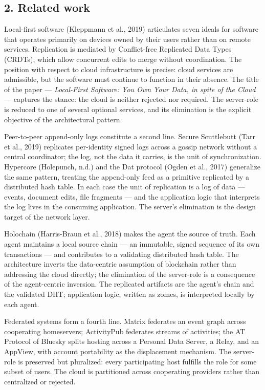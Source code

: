 \documentclass[
]{article}
\begin{document}
\subsection{2. Related work}\label{related-work}

Local-first software (Kleppmann et al., 2019) articulates seven ideals
for software that operates primarily on devices owned by their users
rather than on remote services. Replication is mediated by Conflict-free
Replicated Data Types (CRDTs), which allow concurrent edits to merge
without coordination. The position with respect to cloud infrastructure
is precise: cloud services are admissible, but the software must
continue to function in their absence. The title of the paper ---
\emph{Local-First Software: You Own Your Data, in spite of the Cloud}
--- captures the stance: the cloud is neither rejected nor required. The
server-role is reduced to one of several optional services, and its
elimination is the explicit objective of the architectural pattern.

Peer-to-peer append-only logs constitute a second line. Secure
Scuttlebutt (Tarr et al., 2019) replicates per-identity signed logs
across a gossip network without a central coordinator; the log, not the
data it carries, is the unit of synchronization. Hypercore (Holepunch,
n.d.) and the Dat protocol (Ogden et al., 2017) generalize the same
pattern, treating the append-only feed as a primitive replicated by a
distributed hash table. In each case the unit of replication is a log of
data --- events, document edits, file fragments --- and the application
logic that interprets the log lives in the consuming application. The
server's elimination is the design target of the network layer.

Holochain (Harris-Braun et al., 2018) makes the agent the source of
truth. Each agent maintains a local source chain --- an immutable,
signed sequence of its own transactions --- and contributes to a
validating distributed hash table. The architecture inverts the
data-centric assumption of blockchain rather than addressing the cloud
directly; the elimination of the server-role is a consequence of the
agent-centric inversion. The replicated artifacts are the agent's chain
and the validated DHT; application logic, written as zomes, is
interpreted locally by each agent.

Federated systems form a fourth line. Matrix federates an event graph
across cooperating homeservers; ActivityPub federates streams of
activities; the AT Protocol of Bluesky splits hosting across a Personal
Data Server, a Relay, and an AppView, with account portability as the
displacement mechanism. The server-role is preserved but pluralized:
every participating host fulfills the role for some subset of users. The
cloud is partitioned across cooperating providers rather than
centralized or rejected.
\end{document}
